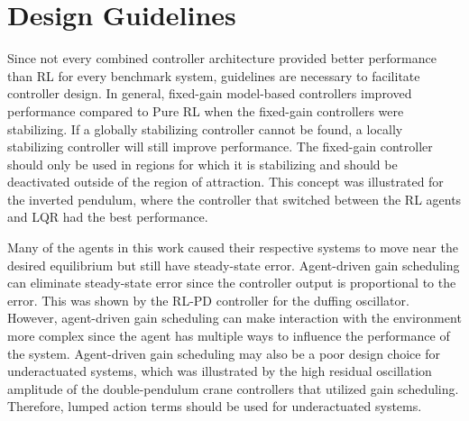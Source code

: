 \section{Design Guidelines}

Since not every combined controller architecture provided better performance than RL for every benchmark system,
guidelines are necessary to facilitate controller design.
In general, fixed-gain model-based controllers improved performance compared to Pure RL when the fixed-gain controllers were stabilizing. If a globally stabilizing controller cannot be found, a locally stabilizing controller will still improve performance.
The fixed-gain controller should only be used in regions for which it is stabilizing and should be deactivated outside of the region of attraction. This concept was illustrated for the inverted pendulum, where the controller that switched between the RL agents and LQR had the best performance.

Many of the agents in this work caused their respective systems to move near the desired equilibrium but still have steady-state error. Agent-driven gain scheduling can eliminate steady-state error since the controller output is proportional to the error. This was shown by the RL-PD controller for the duffing oscillator. However, agent-driven gain scheduling can make interaction with the environment more complex since the agent has multiple ways to influence the performance of the system. Agent-driven gain scheduling may also be a poor design choice for underactuated systems, which was illustrated by the high residual oscillation amplitude of the double-pendulum crane controllers that utilized gain scheduling.
Therefore, lumped action terms should be used for underactuated systems.
%



